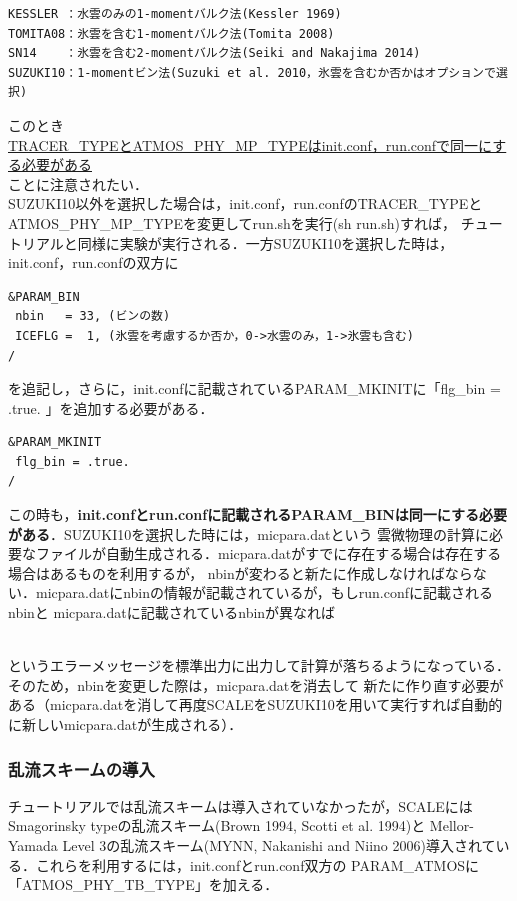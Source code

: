 \begin{verbatim}
KESSLER ：水雲のみの1-momentバルク法(Kessler 1969)
TOMITA08：氷雲を含む1-momentバルク法(Tomita 2008)
SN14    ：氷雲を含む2-momentバルク法(Seiki and Nakajima 2014)
SUZUKI10：1-momentビン法(Suzuki et al. 2010，氷雲を含むか否かはオプションで選択)
\end{verbatim}

このとき\\
\underline{{TRACER\_TYPEとATMOS\_PHY\_MP\_TYPEはinit.conf，run.confで同一にする必要がある}}\\
ことに注意されたい．\\
SUZUKI10以外を選択した場合は，init.conf，run.confのTRACER\_TYPEとATMOS\_PHY\_MP\_TYPEを変更してrun.shを実行(sh run.sh)すれば，
チュートリアルと同様に実験が実行される．一方SUZUKI10を選択した時は，init.conf，run.confの双方に

\begin{verbatim}
&PARAM_BIN
 nbin   = 33, (ビンの数)
 ICEFLG =  1, (氷雲を考慮するか否か，0->水雲のみ，1->氷雲も含む)
/
\end{verbatim}

を追記し，さらに，init.confに記載されているPARAM\_MKINITに「flg\_bin = .true. 」を追加する必要がある．

\begin{verbatim}
&PARAM_MKINIT
 flg_bin = .true.
/
\end{verbatim}

この時も，{\bf init.confとrun.confに記載されるPARAM\_BINは同一にする必要がある}．SUZUKI10を選択した時には，micpara.datという
雲微物理の計算に必要なファイルが自動生成される．micpara.datがすでに存在する場合は存在する場合はあるものを利用するが，
nbinが変わると新たに作成しなければならない．micpara.datにnbinの情報が記載されているが，もしrun.confに記載されるnbinと
micpara.datに記載されているnbinが異なれば

\\

というエラーメッセージを標準出力に出力して計算が落ちるようになっている．そのため，nbinを変更した際は，micpara.datを消去して
新たに作り直す必要がある（micpara.datを消して再度SCALEをSUZUKI10を用いて実行すれば自動的に新しいmicpara.datが生成される）．

\subsubsection{乱流スキームの導入}
チュートリアルでは乱流スキームは導入されていなかったが，SCALEにはSmagorinsky typeの乱流スキーム(Brown 1994, Scotti et al. 1994)と
Mellor-Yamada Level 3の乱流スキーム(MYNN, Nakanishi and Niino 2006)導入されている．これらを利用するには，init.confとrun.conf双方の
PARAM\_ATMOSに「ATMOS\_PHY\_TB\_TYPE」を加える．

